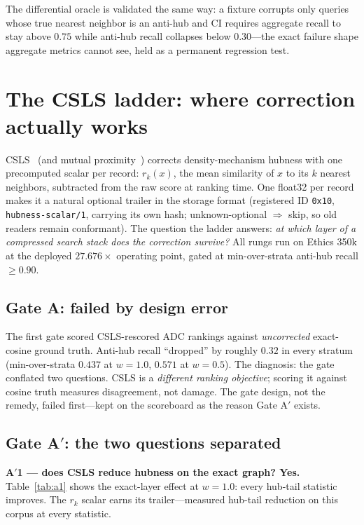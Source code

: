 \documentclass[sigconf, nonacm]{acmart}
\begin{document}
The differential oracle is validated the same way: a fixture corrupts only
queries whose true nearest neighbor is an anti-hub and CI requires
aggregate recall to stay above $0.75$ while anti-hub recall collapses
below $0.30$---the exact failure shape aggregate metrics cannot see, held
as a permanent regression test.

\section{The CSLS ladder: where correction actually works}
\label{sec:csls}

CSLS~\cite{conneau2018word} (and mutual
proximity~\cite{schnitzer2012mutual}) corrects density-mechanism hubness
with one precomputed scalar per record: $r_k(x)$, the mean similarity of
$x$ to its $k$ nearest neighbors, subtracted from the raw score at ranking
time. One float32 per record makes it a natural optional trailer in the
storage format (registered ID \texttt{0x10},
\texttt{hubness-scalar/1}, carrying its own hash; unknown-optional
$\Rightarrow$ skip, so old readers remain conformant). The question the
ladder answers: \emph{at which layer of a compressed search stack does the
correction survive?} All rungs run on Ethics 350k at the deployed
$27.676\times$ operating point, gated at min-over-strata anti-hub recall
$\ge 0.90$.

\subsection{Gate A: failed by design error}

The first gate scored CSLS-rescored ADC rankings against
\emph{uncorrected} exact-cosine ground truth. Anti-hub recall ``dropped''
by roughly $0.32$ in every stratum (min-over-strata $0.437$ at $w=1.0$,
$0.571$ at $w=0.5$). The diagnosis: the gate conflated two questions.
CSLS is a \emph{different ranking objective}; scoring it against cosine
truth measures disagreement, not damage. The gate design, not the remedy,
failed first---kept on the scoreboard as the reason Gate A$'$ exists.

\subsection{Gate A$'$: the two questions separated}

\textbf{A$'$1 --- does CSLS reduce hubness on the exact graph? Yes.}
Table~\ref{tab:a1} shows the exact-layer effect at $w=1.0$: every
hub-tail statistic improves. The $r_k$ scalar earns its trailer---measured
hub-tail reduction on this corpus at every statistic.
\end{document}
